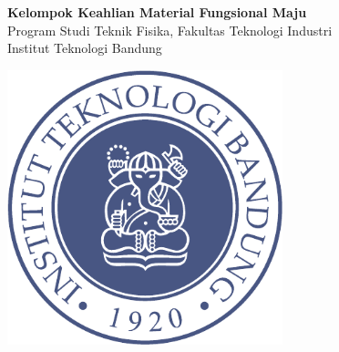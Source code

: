 \documentclass[a0,landscape]{a0poster}
\begin{document}
\begin{minipage}[b][8cm][c]{0.6\textwidth}
{\VeryHuge
 \color{NavyBlue}
 \textbf{Kelompok Keahlian Material Fungsional Maju}\\
}
\color{Blue}
{\Huge Program Studi Teknik Fisika, Fakultas Teknologi Industri}\\
{\Huge Institut Teknologi Bandung}
\end{minipage}
%
\begin{minipage}[b][8cm][c]{0.5\textwidth}
\includegraphics[width=8cm]{ITB_logo.pdf}\\
\end{minipage}

\vspace{1cm}

\Large
\end{document}
